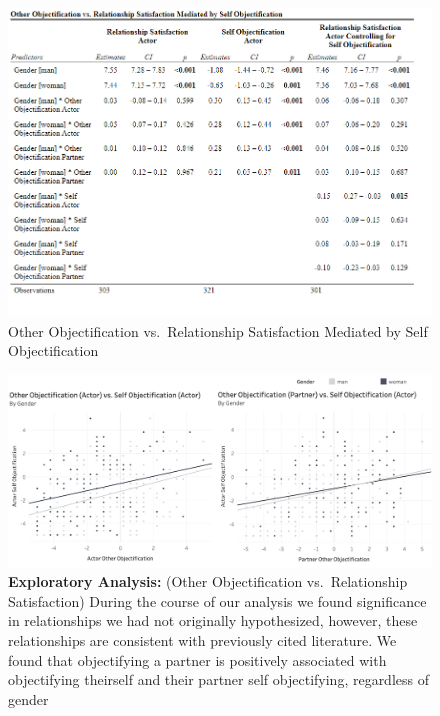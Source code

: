 \documentclass[
  english,
  man]{apa6}
\begin{document}
\begin{figure}
\centering
\includegraphics{Images/ResultsTableEdited.png}
\caption{Other Objectification vs.~Relationship Satisfaction Mediated by Self Objectification}
\end{figure}

\begin{figure}
\centering
\includegraphics{Images/OO_vs_RSA.png}
\caption{\textbf{Exploratory Analysis:} (Other Objectification vs.~Relationship Satisfaction) During the course of our analysis we found significance in relationships we had not originally hypothesized, however, these relationships are consistent with previously cited literature. We found that objectifying a partner is positively associated with objectifying theirself and their partner self objectifying, regardless of gender}
\end{figure}
\end{document}
